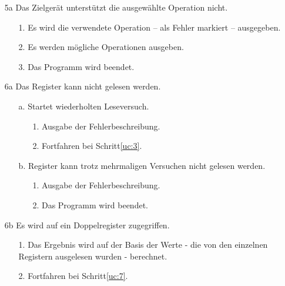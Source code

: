 \documentclass[Bachelorarbeit.tex]{subfiles}
\begin{document}
\begin{enumerate}
%
\item[5a] Das Zielgerät unterstützt die ausgewählte Operation nicht.
\begin{enumerate}
\itemsep0em
\item[1.] Es wird die verwendete Operation – als Fehler markiert – ausgegeben.
\item[2.] Es werden mögliche Operationen ausgeben.
\item[3.] Das Programm wird beendet.
\end{enumerate}
%
\item[6a] Das Register kann nicht gelesen werden.
\begin{enumerate}
\itemsep0em
\item[a.] Startet wiederholten Leseversuch.
	\begin{enumerate}
	\itemsep0em
	\item[1.] Ausgabe der Fehlerbeschreibung.
	\item[2.] Fortfahren bei Schritt\ref{uc:3}.
	\end{enumerate}
\item[b.] Register kann trotz mehrmaligen Versuchen nicht gelesen werden.
	\begin{enumerate}
	\itemsep0em
	\item[1.] Ausgabe der Fehlerbeschreibung.
	\item[2.] Das Programm wird beendet.
	\end{enumerate}
\end{enumerate}
%
\item[6b] Es wird auf ein Doppelregister zugegriffen.
\begin{enumerate}
\itemsep0em
\item[1.] Das Ergebnis wird auf der Basis der Werte - die von den einzelnen 
Registern ausgelesen wurden - berechnet.
\item[2.] Fortfahren bei Schritt\ref{uc:7}.
\end{enumerate}
%
\end{enumerate}	%
\end{document}
